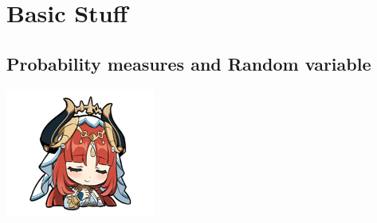 \documentclass[12pt,oneside]{book}
\begin{document}
\setmainfont{Meows}

\tableofcontents

\chapter{Basic Stuff}
\section{Probability measures and Random variable}
\begin{marginfigure}%
    \includegraphics[width=2.4\marginparwidth]{graphics/(40).png}
\end{marginfigure}%
\end{document}
